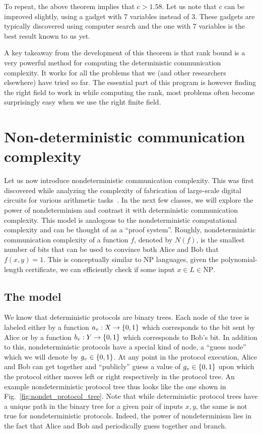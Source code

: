 \documentclass[letterpaper]{article}
\providecommand\cbrac[1]{\ensuremath \left\{#1\right\}}
\newcommand{\X}{X}
\newcommand{\Y}{Y}
\newcommand{\nf}{N(f)}
\begin{document}
\begin{remark}
To repeat, the above theorem implies that $c > 1.58$. Let us note that $c$ can be improved slightly, using a gadget with 7 variables instead of 3. These gadgets are typically discovered using computer search and the one with 7 variables is the best result known to us yet.

A key takeaway from the development of this theorem is that rank bound is a very powerful method for computing the deterministic communication complexity. It works for all the problems that we (and other researchers elsewhere) have tried so far. The essential part of this program is however finding the right field to work in while computing the rank, most problems often become surprisingly easy when we use the right finite field.
\end{remark}


\section{Non-deterministic communication complexity}

Let us now introduce nondeterministic communication complexity. This was first discovered while analyzing the complexity of fabrication of large-scale digital circuits for various arithmetic tasks~\cite{lipton1981lower}. In the next few classes, we will explore the power of nondeterminism and contrast it with deterministic communication complexity. This model is analogous to the nondeterministic computational complexity and can be thought of as a ``proof system''. Roughly, nondeterministic communication complexity of a function $f$, denoted by $\nf$, is the smallest number of bits that can be used to convince both Alice and Bob that $f(x,y) = 1$. This is conceptually similar to $\mathrm{NP}$ languages, given the polynomial-length certificate, we can efficiently check if some input $x \in L \in \mathrm{NP}$.

\subsection{The model}

We know that deterministic protocols are binary trees. Each node of the tree is labeled either by a function $a_v : \X \to \cbrac{0,1}$ which corresponds to the bit sent by Alice or by a function $b_v : \Y \to \cbrac{0,1}$ which corresponds to Bob's bit. In addition to this, nondeterministic protocols have a special kind of node, a ``guess node'' which we will denote by $g_v \in \cbrac{0,1}$. At any point in the protocol execution, Alice and Bob can get together and ``publicly'' guess a value of $g_v \in \cbrac{0,1}$ upon which the protocol either moves left or right respectively in the protocol tree. An example nondeterministic protocol tree thus looks like the one shown in Fig.~\ref{fig:nondet_protocol_tree}. Note that while deterministic protocol trees have a unique path in the binary tree for a given pair of inputs $x, y$, the same is not true for nondeterministic protocols. Indeed, the power of nondeterminism lies in the fact that Alice and Bob and periodically guess together and branch.
\end{document}
